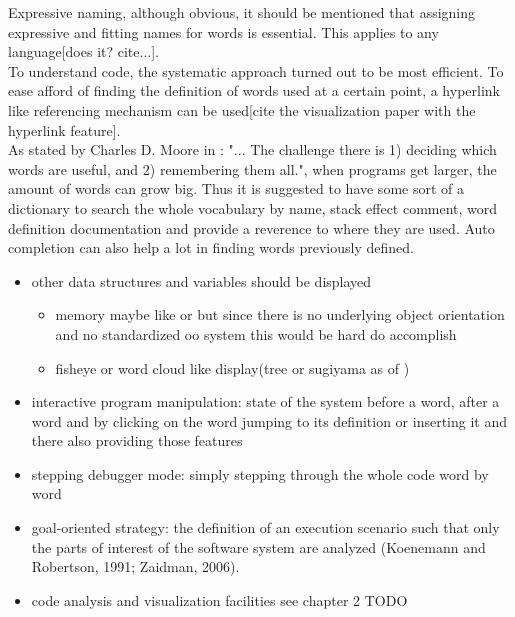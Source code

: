 Expressive naming, although obvious, it should be mentioned that assigning expressive and fitting names for words is essential. This applies to any language[does it? cite...].\\
To understand code, the systematic approach turned out to be most efficient\cite{Robillard:2004:EDI:1042203.1042417}. To ease afford of finding the definition of words used at a certain point, a hyperlink like referencing mechanism can be used[cite the visualization paper with the hyperlink feature].\\
As stated by \gls{Charles D. Moore} in \cite{Biancuzzi:2009:MPC:1592983}: "... The challenge there is 1) deciding
which words are useful, and 2) remembering them all.", when programs get larger, the amount of words can grow big. Thus it is suggested to have some sort of a dictionary to search the whole vocabulary by name, stack effect comment, word definition documentation and provide a reverence to where they are used. Auto completion can also help a lot in finding words previously defined.

\begin{itemize}

\item other data structures and variables should be displayed
	\begin{itemize}
	\item memory maybe like \cite{ReissProgrammingEnvironments1995} or \cite{Aftandilian:2010:HIH:1879211.1879222} but since there is no underlying object orientation and no standardized oo system this would be hard do accomplish
	\item fisheye or word cloud like display(tree or sugiyama as of \cite{Storey:1997:IVT:857188.857642})
	\end{itemize}


\item interactive program manipulation: state of the system before a word, after a word and by clicking on the word jumping to its definition or inserting it and there also providing those features

\item stepping debugger mode: simply stepping through the whole code word by word

\item goal-oriented strategy: the definition of an execution scenario such that only the parts of interest of the software system are analyzed (Koenemann and Robertson, 1991; Zaidman,
2006).

\item code analysis and visualization facilities see chapter 2 TODO
\end{itemize}

